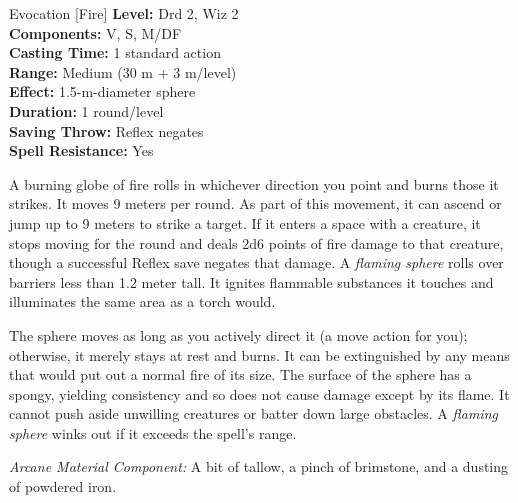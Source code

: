 {Evocation [Fire]}
{
	\textbf{Level:}
	Drd 2, Wiz 2\\
	\textbf{Components:}
	V, S, M/DF\\
	\textbf{Casting Time:}
	1 standard action\\
	\textbf{Range:}
	Medium (30 m + 3 m/level)\\
	\textbf{Effect:}
	1.5-m-diameter sphere\\
	\textbf{Duration:}
	1 round/level\\
	\textbf{Saving Throw:}
	Reflex negates\\
	\textbf{Spell Resistance:}
	Yes\\
}
{
	A burning globe of fire rolls in whichever direction you point and burns those it strikes. It moves 9 meters per round. As part of this movement, it can ascend or jump up to 9 meters to strike a target. If it enters a space with a creature, it stops moving for the round and deals 2d6 points of fire damage to that creature, though a successful Reflex save negates that damage. A \emph{flaming sphere} rolls over barriers less than 1.2 meter tall. It ignites flammable substances it touches and illuminates the same area as a torch would.

	The sphere moves as long as you actively direct it (a move action for you); otherwise, it merely stays at rest and burns. It can be extinguished by any means that would put out a normal fire of its size. The surface of the sphere has a spongy, yielding consistency and so does not cause damage except by its flame. It cannot push aside unwilling creatures or batter down large obstacles. A \emph{flaming sphere} winks out if it exceeds the spell's range.

	\textit{Arcane Material Component:}
	A bit of tallow, a pinch of brimstone, and a dusting of powdered iron.

}
